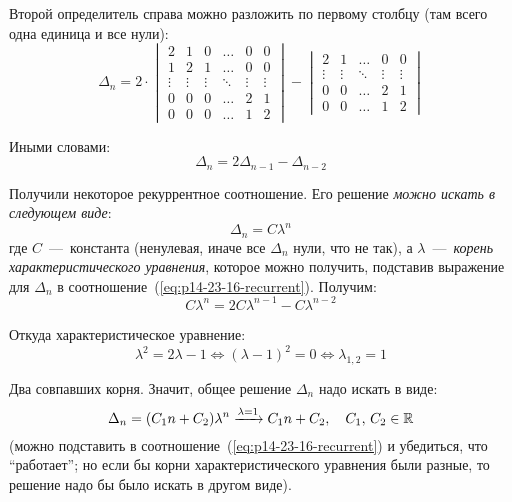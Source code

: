 \documentclass[a4paper,12pt]{article}
\theoremstyle{remark}
\begin{document}
\begin{solution}
    Второй определитель справа можно разложить по первому столбцу (там всего одна единица и все нули):
    \[
      \Delta_n
      = 2 \cdot \begin{vmatrix}
        2      & 1      & 0      & \ldots & 0      & 0\\
        1      & 2      & 1      & \ldots & 0      & 0\\
        \vdots & \vdots & \vdots & \ddots & \vdots & \vdots\\
        0      & 0      & 0      & \ldots & 2      & 1\\
        0      & 0      & 0      & \ldots & 1      & 2
      \end{vmatrix} - \begin{vmatrix}
        2      & 1      & \ldots & 0      & 0\\
        \vdots & \vdots & \ddots & \vdots & \vdots\\
        0      & 0      & \ldots & 2      & 1\\
        0      & 0      & \ldots & 1      & 2
      \end{vmatrix}
    \]
    
    Иными словами:
    \begin{equation}\label{eq:p14-23-16-recurrent}
      \Delta_n = 2 \Delta_{n - 1} - \Delta_{n - 2}
    \end{equation}
    
    Получили некоторое рекуррентное соотношение.
    Его решение \emph{можно искать в следующем виде}:
    \[
      \Delta_n = C \lambda^n
    \]
    где $C$~---~константа (ненулевая, иначе все $\Delta_n$ нули, что не так), а $\lambda$~---~\emph{корень характеристического уравнения}, которое можно получить, подставив выражение для $\Delta_n$ в соотношение~(\ref{eq:p14-23-16-recurrent}).
    Получим:
    \[
      C \lambda^n = 2 C \lambda^{n - 1} - C \lambda^{n - 2}
    \]
    
    Откуда характеристическое уравнение:
    \[
      \boxed{\lambda^2 = 2 \lambda - 1} \Leftrightarrow (\lambda - 1)^2 = 0 \Leftrightarrow \lambda_{1, 2} = 1
    \]
    
    Два совпавших корня.
    Значит, общее решение $\Delta_n$ надо искать в виде:
    \[
      \Delta_n = (C_1 n + C_2) \lambda^n \xrightarrow{\lambda = 1} C_1 n + C_2,\quad C_1,\, C_2 \in \operatorname{\mathbb R}
    \]
    (можно подставить в соотношение~(\ref{eq:p14-23-16-recurrent}) и убедиться, что ``работает''; но если бы корни характеристического уравнения были разные, то решение надо бы было искать в другом виде).
    

\end{solution}
\end{document}
